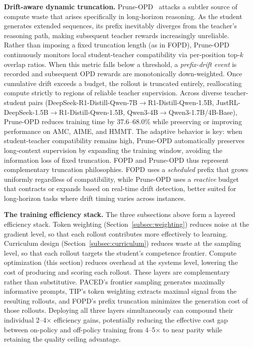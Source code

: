 \documentclass{article} %
\begin{document}
\textbf{Drift-aware dynamic truncation.} Prune-OPD~\citep{yang2026pruneopd} attacks a subtler source of compute waste that arises specifically in long-horizon reasoning. As the student generates extended sequences, its prefix inevitably diverges from the teacher's reasoning path, making subsequent teacher rewards increasingly unreliable. Rather than imposing a fixed truncation length (as in FOPD), Prune-OPD continuously monitors local student-teacher compatibility via per-position top-$k$ overlap ratios. When this metric falls below a threshold, a \emph{prefix-drift event} is recorded and subsequent OPD rewards are monotonically down-weighted. Once cumulative drift exceeds a budget, the rollout is truncated entirely, reallocating compute strictly to regions of reliable teacher supervision. Across diverse teacher-student pairs (DeepSeek-R1-Distill-Qwen-7B$\to$R1-Distill-Qwen-1.5B, JustRL-DeepSeek-1.5B$\to$R1-Distill-Qwen-1.5B, Qwen3-4B$\to$Qwen3-1.7B/4B-Base), Prune-OPD reduces training time by 37.6--68.0\% while preserving or improving performance on AMC, AIME, and HMMT. The adaptive behavior is key: when student-teacher compatibility remains high, Prune-OPD automatically preserves long-context supervision by expanding the training window, avoiding the information loss of fixed truncation. FOPD and Prune-OPD thus represent complementary truncation philosophies. FOPD uses a \emph{scheduled} prefix that grows uniformly regardless of compatibility, while Prune-OPD uses a \emph{reactive} budget that contracts or expands based on real-time drift detection, better suited for long-horizon tasks where drift timing varies across instances.

\textbf{The training efficiency stack.} The three subsections above form a layered efficiency stack. Token weighting (Section~\ref{subsec:weighting}) reduces noise at the gradient level, so that each rollout contributes more effectively to learning. Curriculum design (Section~\ref{subsec:curriculum}) reduces waste at the sampling level, so that each rollout targets the student's competence frontier. Compute optimization (this section) reduces overhead at the systems level, lowering the cost of producing and scoring each rollout. These layers are complementary rather than substitutive. PACED's frontier sampling generates maximally informative prompts, TIP's token weighting extracts maximal signal from the resulting rollouts, and FOPD's prefix truncation minimizes the generation cost of those rollouts. Deploying all three layers simultaneously can compound their individual 2--4$\times$ efficiency gains, potentially reducing the effective cost gap between on-policy and off-policy training from 4--5$\times$ to near parity while retaining the quality ceiling advantage.
\end{document}
